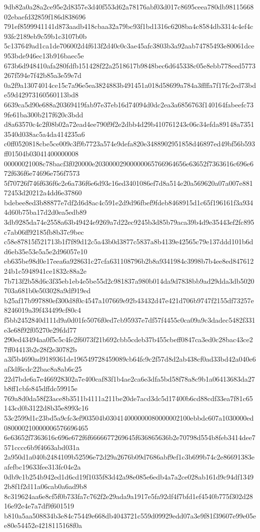 {9db82a0a28a2ce95e2d8357e3d40f553d62a78176abf03d017c8695ceea780db9811566802ebaefd32859f186d838696
791ef8599941141d873aadb418cbaa32a79bc93f1bd1316c6208ba4c8584db3314c4ef4c93fc2189eb9c59b1c3107b0b
5c137649ad1ca1de706002d4f613f2d40c0c3ae45afc3803b3a92aab74785493e80061dce953bde946ec13b916baec5e
673b6d948410afa280fdfb151428f22a2518617b9848bec6d645338c05e8ebb778eed5773267f594e7f42b85a3e59e7d
0a2f9a13074014ce15c7a96e5ea3824883b491451a018d58699a784a3ffffa7f17fc2ed73bde59d42973160560113bd8
6639ca5d90e688a20369419fab97e37eb16d74094d0dc2ea3a6856763f140164fabeefc739fe61ba300b217f620c3bdd
d8a63570c4c2f08b02a72ead4ee790f9f2e2dbb4d29b410761243c06c34efda89148a73513540d038ac5a4da414235a6
c0ff0520818cbe5ce009c3f9b7723a574e9defa820e3488902951858d46897ed49bf56b593ff01504b03041400000008
00000021008c78bacf3f020000e20300002900000065766964656e63652f7363616c696e672f636f6e74696e756f7573
5f70726f746f636f6c2e6a736f6e6d93c16ed3401086ef7d8a514e20a569620a07a007e88172453d20212a4dd6e37860
bdebee8ed3b88877e7df2d6d8ac4c591e2d9d96fbef9fdeb8468915d1c65f196161f3a9344d60b75ba17d2d0ea5edb89
3db9285da74e2558a63b49424e9269a7d22ec9245b3d85b79aca39b4d9e35443ef2fc895c7ab06ff92185fb8b37c9bec
c58e87815f521713b1f7f89d12c5a43b0d3877c5837a8b4139e42565c79e137ddd101b6dd6eb35e53e5a5e2d96057e10
eb635be98d0e17eea6a928631c27cfa631108796b2b8a9341984c3998b7b4ee8ed84761224b1c5948941ce1832c88a2e
7b713f2b58d6c3f35eb1eb4e5be55d2c981837a980b014da9d7838bb9ad29dda3db5020703a681b0e503028a9df919ed
b25af17b997880ef300d8f0c4547a107669e92b43432d47e421d706b9747f2155df73257e8246019a39f434499cf80c4
f5bb2452840d111d9a0d01fe5076f0ed7cb95937e7df57f4455c0ca09a9c3dadec5482f331e3e68f92f05270e29fdd77
290ed43494aa0f5c5c4fe2f6073f21b692cbb5cdeb37b455cbeff0847ca3ed0c28bac43ce27ff04413b2e28f2e30782b
a3f5b4690ad9189361de196549728459089cb64fc9c2f57d8d2ab438cf0ad33bd42a040e6af3df6cdc22bac8a8ab6c25
22d7bde6a7e466928302a7e400caf83f1b4ae2ca6e3dfa5bd58f78a8c9b1a06413683da27b8ff1cbfe845dffdc59915e
769a8d0da58f23ace8b3511b4111a211be20de7acd3dc5d17400b6cd88cdf33ea7f81c65143cd0b3122d8b35e8993c16
53c2599d1c23bd5a9cfc3ef903504b030414000000080000002100ebbdc607a1030000ed080000210000006576696465
6e63652f7363616c696e672f6f6666677269645f636865636b2e70798d554b8feb3414dee7571cccc6b9f4663abd031a
2a950d1a040b2484109b52596e72d29a2676b09d7686abf9ef1c3b699b74c2e86691383eafefbc19633fee313fc04e2a
0db9c1b254b942ed1d6cd19f1035f83d42a98e085e6edb4a7a2ce028ab161d9c94df13492b8f1f2d11a06cab0a6ad9b8
8c319624aa6e8cf5f0b733fa7c762f2e29ada9a1917e5fa92df4f7bfd1ef4540b775f302d2816e92e4e7a7df9f601519
b810a5aa508834b3e84c75449e668db4043721c559d09929edd07a3e9f81f39607e99e05ee80e54452e4218115168f0a
}
